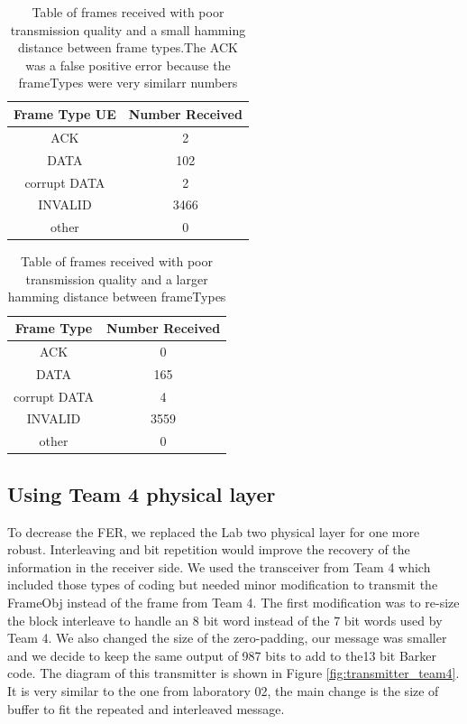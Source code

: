 \begin{table}[ht]
	\centering
		\begin{tabular}{| c | c | }
		\hline                       
		Frame Type UE & Number Received\\
		\hline
			ACK & 2\\
			DATA & 102\\
			corrupt DATA & 2\\
			INVALID & 3466\\
			other & 0\\
		\hline
		\end{tabular}
	\caption{Table of frames received with poor transmission quality and a small hamming distance between frame types.The ACK was a false positive error because the frameTypes were very similarr numbers}
	\label{tab:2ACK}
\end{table}

\begin{table}[ht]
	\centering
		\begin{tabular}{| c | c | }
		\hline                       
		Frame Type & Number Received\\
		\hline
			ACK & 0\\
			DATA & 165\\
			corrupt DATA & 4\\
			INVALID & 3559\\
			other & 0\\
		\hline
		\end{tabular}
	\caption{Table of frames received with poor transmission quality and a larger hamming distance between frameTypes}
	\label{tab:0ACK}
\end{table}
\subsection{Using Team 4 physical layer}
\label{team4_results}
To decrease the FER, we replaced the Lab two physical layer for one more robust. Interleaving and bit repetition would improve the recovery of the information in the receiver side.
We used the transceiver from Team 4  which included those types of coding but needed minor modification to transmit the FrameObj instead of the frame from Team 4.
The first modification was to re-size the block interleave to handle an 8 bit word instead of the 7 bit words used by Team 4. We also changed the size of the zero-padding, our message was smaller and we decide to keep the same output of 987 bits to add to the13 bit Barker code. The diagram of this transmitter is shown in Figure \ref{fig:transmitter_team4}. It is very similar to the one from laboratory 02,  the main change is the size of buffer to fit the repeated and interleaved message. 
 
